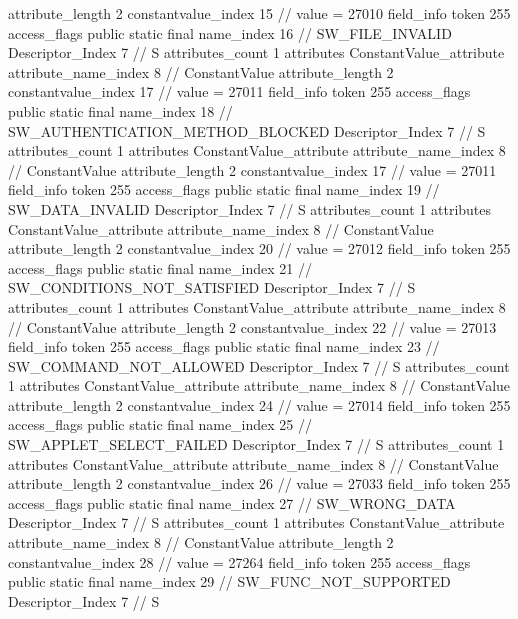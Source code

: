 {{{{{{{					attribute_length	2
					constantvalue_index	15		// value = 27010
				}
				}
			}
			field_info {
				token	255
				access_flags	public static final
				name_index	16		// SW_FILE_INVALID
				Descriptor_Index	7		// S
				attributes_count	1
				attributes {
				ConstantValue_attribute {
					attribute_name_index	8		// ConstantValue
					attribute_length	2
					constantvalue_index	17		// value = 27011
				}
				}
			}
			field_info {
				token	255
				access_flags	public static final
				name_index	18		// SW_AUTHENTICATION_METHOD_BLOCKED
				Descriptor_Index	7		// S
				attributes_count	1
				attributes {
				ConstantValue_attribute {
					attribute_name_index	8		// ConstantValue
					attribute_length	2
					constantvalue_index	17		// value = 27011
				}
				}
			}
			field_info {
				token	255
				access_flags	public static final
				name_index	19		// SW_DATA_INVALID
				Descriptor_Index	7		// S
				attributes_count	1
				attributes {
				ConstantValue_attribute {
					attribute_name_index	8		// ConstantValue
					attribute_length	2
					constantvalue_index	20		// value = 27012
				}
				}
			}
			field_info {
				token	255
				access_flags	public static final
				name_index	21		// SW_CONDITIONS_NOT_SATISFIED
				Descriptor_Index	7		// S
				attributes_count	1
				attributes {
				ConstantValue_attribute {
					attribute_name_index	8		// ConstantValue
					attribute_length	2
					constantvalue_index	22		// value = 27013
				}
				}
			}
			field_info {
				token	255
				access_flags	public static final
				name_index	23		// SW_COMMAND_NOT_ALLOWED
				Descriptor_Index	7		// S
				attributes_count	1
				attributes {
				ConstantValue_attribute {
					attribute_name_index	8		// ConstantValue
					attribute_length	2
					constantvalue_index	24		// value = 27014
				}
				}
			}
			field_info {
				token	255
				access_flags	public static final
				name_index	25		// SW_APPLET_SELECT_FAILED
				Descriptor_Index	7		// S
				attributes_count	1
				attributes {
				ConstantValue_attribute {
					attribute_name_index	8		// ConstantValue
					attribute_length	2
					constantvalue_index	26		// value = 27033
				}
				}
			}
			field_info {
				token	255
				access_flags	public static final
				name_index	27		// SW_WRONG_DATA
				Descriptor_Index	7		// S
				attributes_count	1
				attributes {
				ConstantValue_attribute {
					attribute_name_index	8		// ConstantValue
					attribute_length	2
					constantvalue_index	28		// value = 27264
				}
				}
			}
			field_info {
				token	255
				access_flags	public static final
				name_index	29		// SW_FUNC_NOT_SUPPORTED
				Descriptor_Index	7		// S
}}}}}
